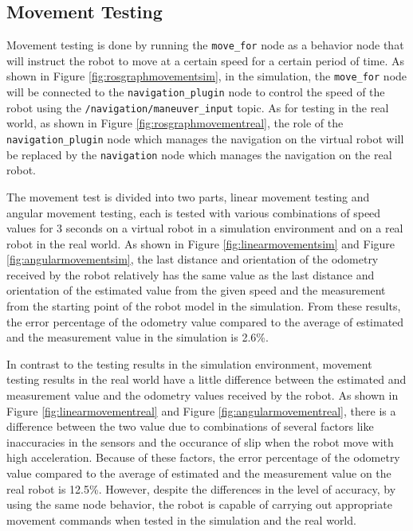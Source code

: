 \subsection{Movement Testing}
\label{subsec:movementtesting}




Movement testing is done by running the \lstinline{move_for} node as a behavior node that will instruct the robot to move at a certain speed for a certain period of time.
As shown in Figure \ref{fig:rosgraphmovementsim},
  in the simulation,
  the \lstinline{move_for} node will be connected to the \lstinline{navigation_plugin} node to control the speed of the robot using the \lstinline{/navigation/maneuver_input} topic.
As for testing in the real world, as shown in Figure \ref{fig:rosgraphmovementreal},
  the role of the \lstinline{navigation_plugin} node which manages the navigation on the virtual robot will be replaced by the \lstinline{navigation} node which manages the navigation on the real robot.




The movement test is divided into two parts,
  linear movement testing and angular movement testing,
  each is tested with various combinations of speed values for 3 seconds on a virtual robot in a simulation environment and on a real robot in the real world.
As shown in Figure \ref{fig:linearmovementsim} and Figure \ref{fig:angularmovementsim},
  the last distance and orientation of the odometry received by the robot relatively has the same value as the last distance and orientation of the estimated value from the given speed and the measurement from the starting point of the robot model in the simulation.
From these results, the error percentage of the odometry value compared to the average of estimated and the measurement value in the simulation is 2.6\%.




In contrast to the testing results in the simulation environment,
  movement testing results in the real world have a little difference between the estimated and measurement value and the odometry values received by the robot.
As shown in Figure \ref{fig:linearmovementreal} and Figure \ref{fig:angularmovementreal},
  there is a difference between the two value due to combinations of several factors like inaccuracies in the sensors and the occurance of slip when the robot move with high acceleration.
Because of these factors,
  the error percentage of the odometry value compared to the average of estimated and the measurement value on the real robot is 12.5\%.
However,
  despite the differences in the level of accuracy,
  by using the same node behavior,
  the robot is capable of carrying out appropriate movement commands when tested in the simulation and the real world.
